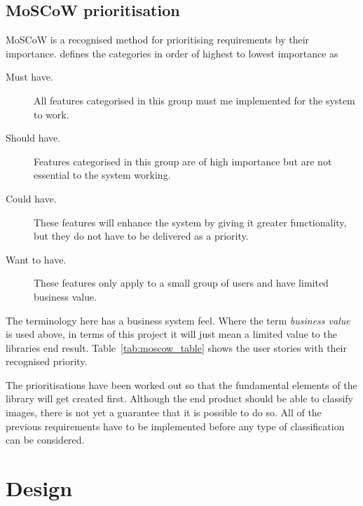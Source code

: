 \documentclass[11pt,oneside]{report}
\begin{document}
		\section{MoSCoW prioritisation}
			MoSCoW is a recognised method for prioritising requirements by their importance.  defines the categories in order of highest to lowest importance as
			\begin{description}
				\item[Must have. ] All features categorised in this group must me implemented for the system to work.
				\item[Should have. ] Features categorised in this group are of high importance but are not essential to the system working.
				\item[Could have. ] These features will enhance the system by giving it greater functionality, but they do not have to be delivered as a priority.
				\item[Want to have. ] These features only apply to a small group of users and have limited business value.
			\end{description}
			The terminology here has a business system feel.
			Where the term \textit{business value} is used above, in terms of this project it will just mean a limited value to the libraries end result.
			Table~\ref{tab:moscow_table} shows the user stories with their recognised priority.
			
			\clearpage
			The prioritisations have been worked out so that the fundamental elements of the library will get created first.
			Although the end product should be able to classify images, there is not yet a guarantee that it is possible to do so.
			All of the previous requirements have to be implemented before any type of classification can be considered.

    		
	
	\chapter{Design}\label{chap:des}
\end{document}
